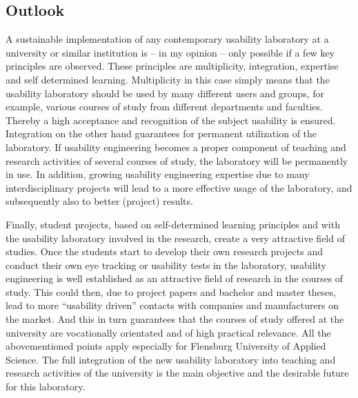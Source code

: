 \documentclass[output=paper]{langsci/langscibook}
\begin{document}
\subsection{Outlook}

A sustainable implementation of any contemporary usability laboratory at a university or similar institution is -- in my opinion -- only possible if a few key principles are observed. These principles are multiplicity, integration, expertise and self determined learning. Multiplicity in this case simply means that the usability laboratory should be used by many different users and groups, for example, various courses of study from different departments and faculties. Thereby a high acceptance and recognition of the subject usability is ensured. Integration on the other hand guarantees for permanent utilization of the laboratory. If usability engineering becomes a proper component of teaching and research activities of several courses of study, the laboratory will be permanently in use. In addition, growing usability engineering expertise due to many interdisciplinary projects will lead to a more effective usage of the laboratory, and subsequently also to better (project) results.


Finally, student projects, based on self-determined learning principles and with the usability laboratory involved in the research, create a very attractive field of studies. Once the students start to develop their own research projects and conduct their own eye tracking or usability tests in the laboratory, usability engineering is well established as an attractive field of research in the courses of study. This could then, due to project papers and bachelor and master theses, lead to more ``usability driven'' contacts with companies and manufacturers on the market. And this in turn guarantees that the courses of study offered at the university are vocationally orientated and of high practical relevance. All the abovementioned points apply especially for Flensburg University of Applied Science. The full integration of the new usability laboratory into teaching and research activities of the university is the main objective and the desirable future for this laboratory.
\end{document}
